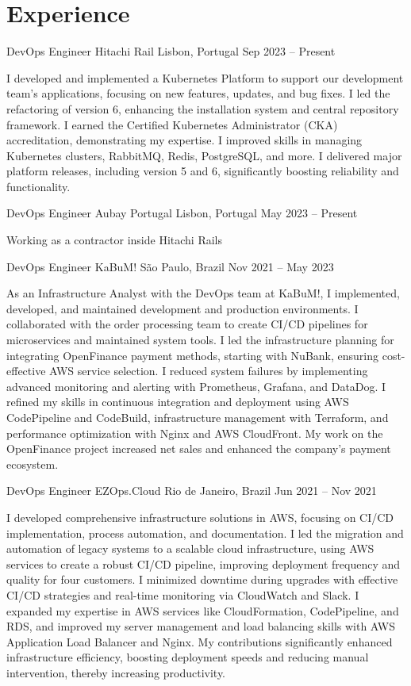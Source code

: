 \section*{Experience}

\experience
  {DevOps Engineer}
  {Hitachi Rail}
  {Lisbon, Portugal}
  {Sep 2023 --  Present}
  {
    \item I developed and implemented a Kubernetes Platform to support our development team's applications, focusing on new features, updates, and bug fixes. I led the refactoring of version 6, enhancing the installation system and central repository framework. I earned the Certified Kubernetes Administrator (CKA) accreditation, demonstrating my expertise. I improved skills in managing Kubernetes clusters, RabbitMQ, Redis, PostgreSQL, and more. I delivered major platform releases, including version 5 and 6, significantly boosting reliability and functionality.
  }

\experience
  {DevOps Engineer}
  {Aubay Portugal}
  {Lisbon, Portugal}
  {May 2023 -- Present}
  {
    \item Working as a contractor inside Hitachi Rails
  }

\experience
  {DevOps Engineer}
  {KaBuM!}
  {São Paulo, Brazil}
  {Nov 2021 --  May 2023}
  {
    \item As an Infrastructure Analyst with the DevOps team at KaBuM!, I implemented, developed, and maintained development and production environments. I collaborated with the order processing team to create CI/CD pipelines for microservices and maintained system tools. I led the infrastructure planning for integrating OpenFinance payment methods, starting with NuBank, ensuring cost-effective AWS service selection. I reduced system failures by implementing advanced monitoring and alerting with Prometheus, Grafana, and DataDog. I refined my skills in continuous integration and deployment using AWS CodePipeline and CodeBuild, infrastructure management with Terraform, and performance optimization with Nginx and AWS CloudFront. My work on the OpenFinance project increased net sales and enhanced the company's payment ecosystem.
  }

\experience
  {DevOps Engineer}
  {EZOps.Cloud}
  {Rio de Janeiro, Brazil}
  {Jun 2021 -- Nov 2021}
  {
    \item I developed comprehensive infrastructure solutions in AWS, focusing on CI/CD implementation, process automation, and documentation. I led the migration and automation of legacy systems to a scalable cloud infrastructure, using AWS services to create a robust CI/CD pipeline, improving deployment frequency and quality for four customers. I minimized downtime during upgrades with effective CI/CD strategies and real-time monitoring via CloudWatch and Slack. I expanded my expertise in AWS services like CloudFormation, CodePipeline, and RDS, and improved my server management and load balancing skills with AWS Application Load Balancer and Nginx. My contributions significantly enhanced infrastructure efficiency, boosting deployment speeds and reducing manual intervention, thereby increasing productivity.
  }


